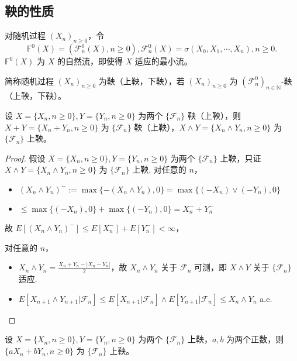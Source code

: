 \documentclass[lang=cn,10pt,thmcnt=section]{elegantbook}
\begin{document}
\subsection{鞅的性质}
\begin{definition}
	对随机过程 $(X_n)_{n \geq 0}$，令
\[
\mathbb{F}^0(X) = (\mathcal{F}^0_n(X), n \geq 0), \mathcal{F}^0_n(X) = \sigma(X_0, X_1, \cdots, X_n), n \geq 0.
\]
$\mathbb{F}^0(X)$ 为 $X$ 的自然流，即使得 $X$ 适应的最小流。
\end{definition}
\begin{definition}
	简称随机过程 $(X_n)_{n \geq 0}$ 为鞅（上鞅，下鞅），若 $(X_n)_{n \geq 0}$ 为 $(\mathcal{F}^0_n)_{n \in \mathbb{N}}$-鞅（上鞅，下鞅）。
\end{definition}
\begin{theorem}
	设 $X = \{X_n, n \geq 0\}, Y = \{Y_n, n \geq 0\}$ 为两个 $\{\mathcal{F}_n\}$ 鞅（上鞅），则 $X + Y = \{X_n + Y_n, n \geq 0\}$ 为 $\{\mathcal{F}_n\}$ 鞅（上鞅），$X \wedge Y = \{X_n \wedge Y_n, n \geq 0\}$ 为 $\{\mathcal{F}_n\}$ 上鞅。
\end{theorem}
\begin{proof}
	假设 $X = \{X_n, n \geq 0\}, Y = \{Y_n, n \geq 0\}$ 为两个 $\{\mathcal{F}_n\}$ 上鞅，只证 $X \wedge Y = \{X_n \wedge Y_n, n \geq 0\}$ 为 $\{\mathcal{F}_n\}$ 上鞅. 对任意的 $n$，
\begin{itemize}
    \item $(X_n \wedge Y_n)^- := \max\{-(X_n \wedge Y_n), 0\} = \max\{(-X_n) \vee (-Y_n), 0\}$
    \item $\leq \max\{(-X_n), 0\} + \max\{(-Y_n), 0\} = X_n^- + Y_n^-$
\end{itemize}
故 $E[(X_n \wedge Y_n)^-] \leq E[X_n^-] + E[Y_n^-] < \infty$，

对任意的 $n$，
\begin{itemize}
    \item $X_n \wedge Y_n = \frac{X_n + Y_n - |X_n - Y_n|}{2}$，故 $X_n \wedge Y_n$ 关于 $\mathcal{F}_n$ 可测，即 $X \wedge Y$ 关于 $\{\mathcal{F}_n\}$ 适应.
    \item $E[X_{n+1} \wedge Y_{n+1}|\mathcal{F}_n] \leq E[X_{n+1}|\mathcal{F}_n] \wedge E[Y_{n+1}|\mathcal{F}_n] \leq X_n \wedge Y_n$ a.e.
\end{itemize}
\end{proof}
\begin{theorem}
	设 $X = \{X_n, n \geq 0\}, Y = \{Y_n, n \geq 0\}$ 为两个 $\{\mathcal{F}_n\}$ 上鞅，$a, b$ 为两个正数，则 $\{aX_n + bY_n, n \geq 0\}$ 为 $\{\mathcal{F}_n\}$ 上鞅。
\end{theorem}
\end{document}
